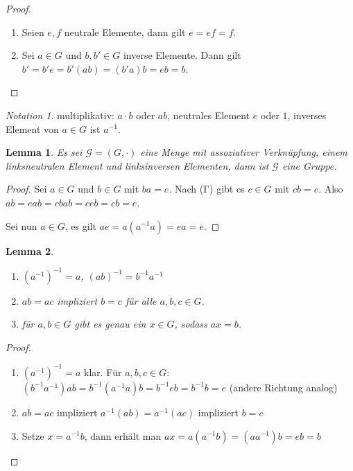 \documentclass[12pt]{scrartcl}%
\newtheorem{lemma}{Lemma}
\theoremstyle{definition}
\theoremstyle{remark}
\newtheorem*{notation}{Notation}
\newcommand{\inv}[1]{\left(#1\right)^{-1}}
\newcommand{\Inv}[1]{#1^{-1}}
\begin{document}
\begin{proof}
    \begin{enumerate}[label=\alph*)]
        \item Seien $e,f$ neutrale Elemente, dann gilt $e=ef=f$.
        \item Sei $a\in G$ und $b,b'\in G$ inverse Elemente. Dann gilt $b'=b'e=b'(ab)=(b'a)b=eb=b$. 
    \end{enumerate}
\end{proof}

\begin{notation}
    multiplikativ: $a\cdot b$ oder $ab$, neutrales Element $e$ oder $1$, inverses Element von $a\in G$ ist $\Inv a$.
\end{notation}

\begin{lemma}
    Es sei $\mathcal{G}=(G,\cdot)$ eine Menge mit assoziativer Verknüpfung, einem linksneutralen Element und linksinversen Elementen, dann ist $\mathcal{G}$ eine Gruppe.
\end{lemma}

\begin{proof}
    Sei $a\in G$ und $b\in G$ mit $ba=e$. Nach (I') gibt es $c\in G$ mit $cb=e$. Also $ab=eab=cbab=ceb=cb=e$.

    Sei nun $a\in G$, es gilt $ae=a(\Inv aa)=ea=e$.
\end{proof}

\begin{lemma}
    \begin{enumerate}
        \item $\inv{\Inv{a}}=a$, $\inv{ab}=\Inv b\Inv a$
        \item $ab=ac$ impliziert $b=c$ für alle $a,b,c\in G$.
        \item für $a,b\in G$ gibt es genau ein $x\in G$, sodass $ax=b$.
    \end{enumerate}
\end{lemma}

\begin{proof}
    \begin{enumerate}
        \item $\inv{\Inv a}=a$ klar. Für $a,b,c\in G$: $(\Inv b\Inv a)ab=\Inv b(\Inv aa)b=\Inv beb=\Inv bb=e$ (andere Richtung analog)
        \item $ab=ac$ impliziert $\Inv a(ab)=\Inv a(ac)$ impliziert $b=c$
        \item Setze $x=\Inv ab$, dann erhält man $ax=a(\Inv ab)=(a\Inv a)b=eb=b$
    \end{enumerate}
\end{proof}
\end{document}

